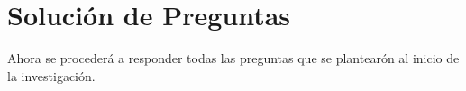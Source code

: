 \section{Solución de Preguntas}
Ahora se procederá a responder todas las preguntas que se plantearón al inicio de la investigación.
















































